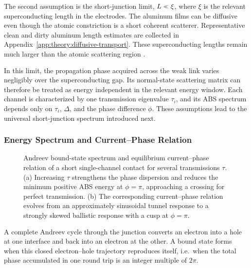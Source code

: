             The second assumption is the short-junction limit, $L\sll\xi$, where $\xi$ is the relevant superconducting length in the electrodes. The aluminum films can be diffusive even though the atomic constriction is a short coherent scatterer. Representative clean and dirty aluminum length estimates are collected in Appendix~\ref{app:theory:diffusive-transport}. These superconducting lengths remain much larger than the atomic scattering region \cite{steinberg_quasi-particle_2008,scheer_conduction_1997}.

            In this limit, the propagation phase acquired across the weak link varies negligibly over the superconducting gap. Its normal-state scattering matrix can therefore be treated as energy independent in the relevant energy window. Each channel is characterized by one transmission eigenvalue $\tau_i$, and its ABS spectrum depends only on $\tau_i$, $\Delta$, and the phase difference $\phi$. These assumptions lead to the universal short-junction spectrum introduced next.

        \subsubsection*{Energy Spectrum and Current--Phase Relation}

            \begin{figure}[t]
                \centering
                \hfill
                \caption{
                    Andreev bound-state spectrum and equilibrium current--phase relation of a short single-channel contact for several transmissions $\tau$.
                    (a) Increasing $\tau$ strengthens the phase dispersion and reduces the minimum positive ABS energy at $\phi=\pi$, approaching a crossing for perfect transmission.
                    (b) The corresponding current--phase relation evolves from an approximately sinusoidal tunnel response to a strongly skewed ballistic response with a cusp at $\phi=\pi$.
                }
                \label{fig:meso:abs}
            \end{figure}

            A complete Andreev cycle through the junction converts an electron into a hole at one interface and back into an electron at the other. A bound state forms when this closed electron--hole trajectory reproduces itself, i.e.~when the total phase accumulated in one round trip is an integer multiple of $2\pi$.

